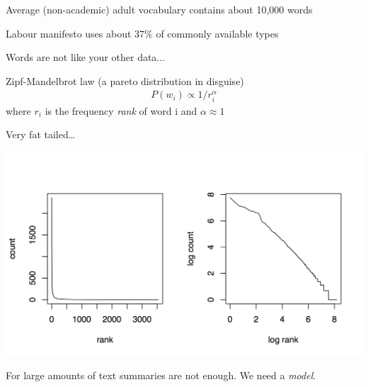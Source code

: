 \documentclass[11pt,compress,professionalfonts]{beamer}
\begin{document}
Average (non-academic) adult vocabulary contains about 10,000 words 

Labour manifesto uses about 37\% of commonly available types




Words are not like your other data... 

Zipf-Mandelbrot law (a pareto distribution in disguise) 
\begin{align*}
P(w_i) \propto 1/{r_i^\alpha}
\end{align*}
where $r_i$ is the frequency \textsl{rank} of word i and $\alpha\approx 1$

Very fat tailed\ldots


\begin{center}
\includegraphics[scale=1.2]{pictures/zipfy}
\end{center}



For large amounts of text summaries are not enough. We need a \textit{model}.
\end{document}
